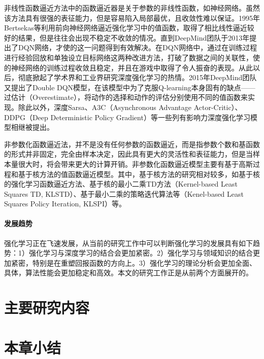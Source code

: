 非线性函数逼近方法中的函数逼近器是关于参数的非线性函数，如神经网络。虽然该方法具有很强的表征能力，但是容易陷入局部最优，且收敛性难以保证。1995年Bertsekas等\citep{bertsekas1995neuro}利用前向神经网络逼近强化学习中的值函数，取得了相比线性逼近较好的结果，但是往往会出现不稳定不收敛的情况。直到DeepMind团队于2013年提出了DQN网络，才使的这一问题得到有效解决。在DQN网络中，通过在训练过程进行经验回放\citep{mnih2013playing}和单独设立目标网络\citep{mnih2015human}这两种改进方法，打破了数据之间的关联性，使的神经网络的训练过程收敛且稳定，并且在游戏中取得了令人振奋的表现。从此以后，彻底掀起了学术界和工业界研究深度强化学习的热情。2015年DeepMind团队又提出了Double DQN模型，在该模型中为了克服Q-learning本身固有的缺点——过估计（Overestimate），将动作的选择和动作的评估分别使用不同的值函数来实现。除此以外，深度Sarsa、A3C（Asynchronous Advantage Actor-Critic）、DDPG（Deep Deterministic Policy Gradient）等一些列有影响力深度强化学习模型相继被提出。

非参数化函数逼近法，并不是没有任何参数的函数逼近，而是指参数个数和基函数的形式并非固定，完全由样本决定，因此具有更大的灵活性和表征能力，但是当样本量很大时，将会带来更大的计算开销。非参数化函数逼近模型主要有基于高斯过程和基于核方法的值函数逼近模型。其中，基于核方法的研究相对较多，如基于核的强化学习函数逼近方法\citep{ormoneit2002kernel}、基于核的最小二乘TD方法（Kernel-based Least Squares TD, KLSTD）\citep{xu2005kernel}、基于最小二乘的策略迭代算法等（Kenel-based Least Squares Policy Iteration, KLSPI）\citep{xu2007kernel}等。

\paragraph{发展趋势}
强化学习正在飞速发展，从当前的研究工作中可以判断强化学习的发展具有如下趋势：1）强化学习与深度学习的结合会更加紧密。2）强化学习与领域知识的结合更加紧密，特别是在重塑回报函数的方向上。3）强化学习的理论分析会更加全面、具体，算法性能会更加稳定和高效。本文的研究工作正是从前两个方面展开的。

\section{主要研究内容}

\section{本章小结}


